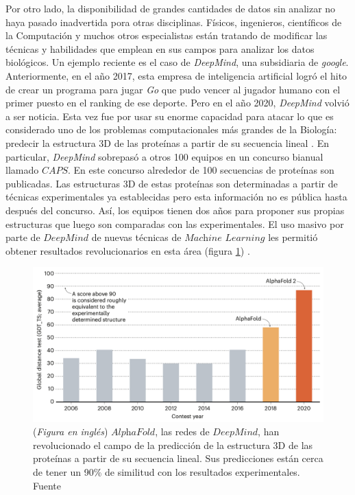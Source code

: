 Por otro lado, la disponibilidad de grandes cantidades de datos sin analizar no haya pasado inadvertida pora otras disciplinas.
Físicos, ingenieros, científicos de la Computación y muchos otros especialistas están tratando de modificar las técnicas y habilidades que emplean en sus campos para analizar los datos biológicos.
Un ejemplo reciente es el caso de \textit{DeepMind}, una subsidiaria de \textit{google}.
Anteriormente, en el año 2017, esta empresa de inteligencia artificial logró el hito de crear un programa para jugar \textit{Go} que pudo vencer al jugador humano con el primer puesto en el ranking de ese deporte.
Pero en el año 2020, \textit{DeepMind} volvió a ser noticia.
Esta vez fue por usar su enorme capacidad para atacar lo que es considerado uno de los problemas computacionales más grandes de la Biología: predecir la estructura 3D de las proteínas a partir de su secuencia lineal \cite{callawayItWillChange2020}.
En particular, \textit{DeepMind} sobrepasó a otros 100 equipos en un concurso bianual llamado $\textit{CAPS}$.
En este concurso alrededor de 100 secuencias de proteínas son publicadas.
Las estructuras 3D de estas proteínas son determinadas a partir de técnicas experimentales ya establecidas pero esta información no es pública hasta después del concurso.
Así, los equipos tienen dos años para proponer sus propias estructuras que luego son comparadas con las experimentales.
El uso masivo por parte de $\textit{DeepMind}$ de nuevas técnicas de $\textit{Machine Learning}$ les permitió obtener resultados revolucionarios en esta área (figura \ref{fig:Deep_Mind}) \cite{callawayItWillChange2020}.
 
\begin{figure}[tb]
  \centering
  \includegraphics[width=0.9\columnwidth]{images/Deep_Mind.png}
  \caption{
      (\textit{Figura en inglés})
      $\textit{AlphaFold}$, las redes de $\textit{DeepMind}$, han revolucionado el campo de la predicción de la estructura 3D de las proteínas a partir de su secuencia lineal.
      Sus predicciones están cerca de tener un 90\% de similitud con los resultados experimentales.
      Fuente \cite{callawayItWillChange2020}
  }
  \label{fig:Deep_Mind}
\end{figure} 

 

